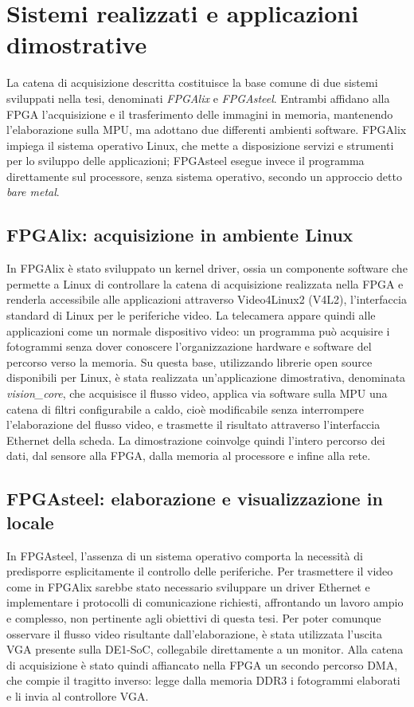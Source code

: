 \documentclass[a4paper,12pt]{article}
\begin{document}
\section{Sistemi realizzati e applicazioni dimostrative}

La catena di acquisizione descritta costituisce la base comune di due sistemi sviluppati nella tesi, denominati \emph{FPGAlix} e \emph{FPGAsteel}. Entrambi affidano alla FPGA l'acquisizione e il trasferimento delle immagini in memoria, mantenendo l'elaborazione sulla MPU, ma adottano due differenti ambienti software. FPGAlix impiega il sistema operativo Linux, che mette a disposizione servizi e strumenti per lo sviluppo delle applicazioni; FPGAsteel esegue invece il programma direttamente sul processore, senza sistema operativo, secondo un approccio detto \emph{bare metal}.

\subsection{FPGAlix: acquisizione in ambiente Linux}

In FPGAlix è stato sviluppato un kernel driver, ossia un componente software che permette a Linux di controllare la catena di acquisizione realizzata nella FPGA e renderla accessibile alle applicazioni attraverso Video4Linux2 (V4L2), l'interfaccia standard di Linux per le periferiche video. La telecamera appare quindi alle applicazioni come un normale dispositivo video: un programma può acquisire i fotogrammi senza dover conoscere l'organizzazione hardware e software del percorso verso la memoria. Su questa base, utilizzando librerie open source disponibili per Linux, è stata realizzata un'applicazione dimostrativa, denominata \emph{vision\_core}, che acquisisce il flusso video, applica via software sulla MPU una catena di filtri configurabile a caldo, cioè modificabile senza interrompere l'elaborazione del flusso video, e trasmette il risultato attraverso l'interfaccia Ethernet della scheda. La dimostrazione coinvolge quindi l'intero percorso dei dati, dal sensore alla FPGA, dalla memoria al processore e infine alla rete.

\subsection{FPGAsteel: elaborazione e visualizzazione in locale}

In FPGAsteel, l'assenza di un sistema operativo comporta la necessità di predisporre esplicitamente il controllo delle periferiche. Per trasmettere il video come in FPGAlix sarebbe stato necessario sviluppare un driver Ethernet e implementare i protocolli di comunicazione richiesti, affrontando un lavoro ampio e complesso, non pertinente agli obiettivi di questa tesi. Per poter comunque osservare il flusso video risultante dall'elaborazione, è stata utilizzata l'uscita VGA presente sulla DE1-SoC, collegabile direttamente a un monitor. Alla catena di acquisizione è stato quindi affiancato nella FPGA un secondo percorso DMA, che compie il tragitto inverso: legge dalla memoria DDR3 i fotogrammi elaborati e li invia al controllore VGA.
\end{document}

